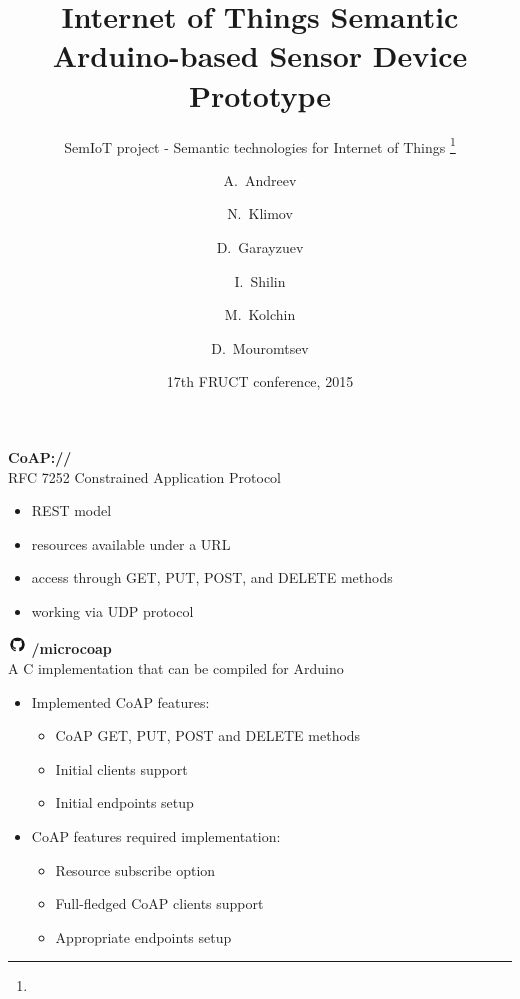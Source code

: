 \documentclass{beamer}
\title{Internet of Things Semantic Arduino-based Sensor Device Prototype}
\subtitle{
    SemIoT project - Semantic technologies for Internet of Things
    \footnote{\semioturl}
}
\author{
    A.~Andreev
    \and
    N.~Klimov
    \and
    D.~Garayzuev
    \and
    I.~Shilin
    \and
    M.~Kolchin
    \and
    D.~Mouromtsev
}
\institute[NRU ITMO] %
{
    ITMO University, St.Petersburg, Russia
}
\date{17th FRUCT conference, 2015}
\begin{document}
    \begin{frame}
        \titlepage
    \end{frame}

    \begin{frame}
        \begin{center}
            \begin{multicols}{2}
                \huge{\textbf{CoAP://}}\\
                \large{RFC 7252 Constrained Application Protocol}
            \end{multicols}
        \end{center}
        \begin{itemize}
            \item REST model
            \item resources available under a URL
            \item access through GET, PUT, POST, and DELETE methods
            \item working via UDP protocol
        \end{itemize}
    \end{frame}

    \begin{frame}
        \begin{multicols}{2}
            \includegraphics[height=0.5cm,keepaspectratio]{github}
            \huge{\textbf{/microcoap}}\\
            \large{A C implementation that can be compiled for Arduino}
        \end{multicols}
        \begin{itemize}
            \item Implemented CoAP features:
                \begin{itemize}
                    \item CoAP GET, PUT, POST and DELETE methods
                    \item Initial clients support
                    \item Initial endpoints setup
                \end{itemize}
            \item CoAP features required implementation:
                \begin{itemize}
                    \item Resource subscribe option
                    \item Full-fledged CoAP clients support
                    \item Appropriate endpoints setup
                \end{itemize}
        \end{itemize}
    \end{frame}
    
\end{document}
